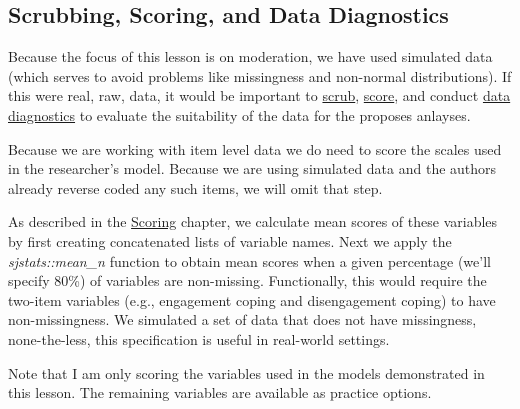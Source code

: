 \documentclass[
  11pt,
]{book}
\begin{document}
\hypertarget{scrubbing-scoring-and-data-diagnostics-2}{%
\subsection{Scrubbing, Scoring, and Data Diagnostics}\label{scrubbing-scoring-and-data-diagnostics-2}}

Because the focus of this lesson is on moderation, we have used simulated data (which serves to avoid problems like missingness and non-normal distributions). If this were real, raw, data, it would be important to \href{https://lhbikos.github.io/ReC_MultivModel/scrub.html}{scrub}, \href{https://lhbikos.github.io/ReC_MultivModel/score.html}{score}, and conduct \href{https://lhbikos.github.io/ReC_MultivModel/DataDx.html}{data diagnostics} to evaluate the suitability of the data for the proposes anlayses.

Because we are working with item level data we do need to score the scales used in the researcher's model. Because we are using simulated data and the authors already reverse coded any such items, we will omit that step.

As described in the \href{https://lhbikos.github.io/ReC_MultivModel/score.html}{Scoring} chapter, we calculate mean scores of these variables by first creating concatenated lists of variable names. Next we apply the \emph{sjstats::mean\_n} function to obtain mean scores when a given percentage (we'll specify 80\%) of variables are non-missing. Functionally, this would require the two-item variables (e.g., engagement coping and disengagement coping) to have non-missingness. We simulated a set of data that does not have missingness, none-the-less, this specification is useful in real-world settings.

Note that I am only scoring the variables used in the models demonstrated in this lesson. The remaining variables are available as practice options.
\end{document}
